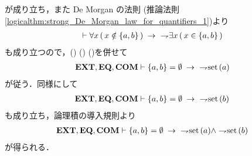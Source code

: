 \begin{sketch}
		が成り立ち，また De Morgan の法則
		(推論法則\ref{logicalthm:strong_De_Morgan_law_for_quantifiers_1})より
		\begin{align}
			\vdash \forall x\, (\, x \notin \{a,b\}\, ) \rarrow\ \negation \exists x\, (\, x \in \{a,b\}\, )
			\label{fom:classes_displayed_in_empty_pair_are_not_sets_3}
		\end{align}
		も成り立つので，()
		()
		()を併せて
		\begin{align}
			\EXTAX,\EQAX,\COMAX \vdash \{a,b\} = \emptyset \rarrow\ \negation \set{a}
		\end{align}
		が従う．同様にして
		\begin{align}
			\EXTAX,\EQAX,\COMAX \vdash \{a,b\} = \emptyset \rarrow\ \negation \set{b}
		\end{align}
		も成り立ち，論理積の導入規則より
		\begin{align}
			\EXTAX,\EQAX,\COMAX \vdash \{a,b\} = \emptyset \rarrow\ \negation \set{a} \wedge \negation \set{b}
		\end{align}
		が得られる．
		\QED
	\end{sketch}